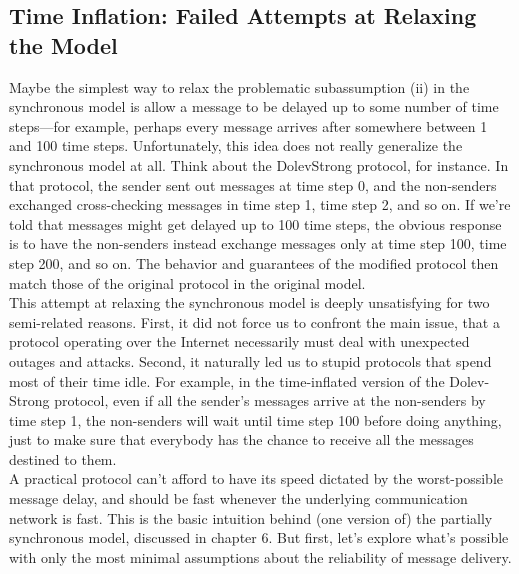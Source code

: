 \subsection{Time Inflation: Failed Attempts at Relaxing the Model}
Maybe the simplest way to relax the problematic subassumption (ii) in the synchronous
model is allow a message to be delayed up to some number of time steps—for example,
perhaps every message arrives after somewhere between 1 and 100 time steps. Unfortunately,
this idea does not really generalize the synchronous model at all. Think about the DolevStrong protocol, for instance. In that protocol, the sender sent out messages at time step 0, and the non-senders exchanged cross-checking messages in time step 1, time step 2, and so
on. If we’re told that messages might get delayed up to 100 time steps, the obvious response
is to have the non-senders instead exchange messages only at time step 100, time step 200, and so on. The behavior and guarantees of the modified protocol then match those of the original protocol in the original model.\\
This attempt at relaxing the synchronous model is deeply unsatisfying for two semi-related reasons. First, it did not force us to confront the main issue, that a protocol operating over the Internet necessarily must deal with unexpected outages and attacks. Second, it
naturally led us to stupid protocols that spend most of their time idle. For example, in the
time-inflated version of the Dolev-Strong protocol, even if all the sender’s messages arrive
at the non-senders by time step 1, the non-senders will wait until time step 100 before
doing anything, just to make sure that everybody has the chance to receive all the messages
destined to them.\\
A practical protocol can’t afford to have its speed dictated by the worst-possible message
delay, and should be fast whenever the underlying communication network is fast. This is
the basic intuition behind (one version of) the partially synchronous model, discussed in
chapter 6. But first, let’s explore what’s possible with only the most minimal assumptions
about the reliability of message delivery.

